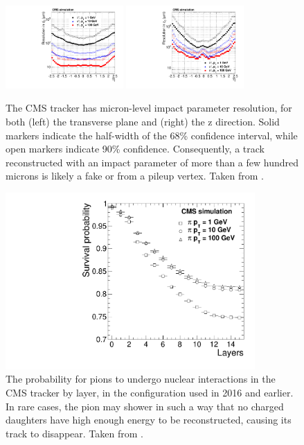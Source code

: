  \begin{figure}[h!]
    \centering
    \includegraphics[width=0.4\textwidth]{figures/pi/resolutionD0VsEta.pdf}
    \includegraphics[width=0.4\textwidth]{figures/pi/resolutionDzVsEta.pdf}
    \caption[Impact parameter resolution in the CMS tracker.]{
      The CMS tracker has micron-level impact parameter resolution, for both (left) the transverse plane and (right) the z direction.
      Solid markers indicate the half-width of the 68\% confidence interval, while open markers indicate 90\% confidence.
      Consequently, a track reconstructed with an impact parameter of more than a few hundred microns is likely a fake or from a pileup vertex.
      Taken from \cite{cmstracking}.}
    \label{fig:hitefficiency}
  \end{figure}  

  \begin{figure}[h!]
    \centering
    \includegraphics[width=0.85\textwidth]{figures/PionSurvivalProbability.pdf}
    \caption[Pion survival in the tracker.]{
      The probability for pions to undergo nuclear interactions in the CMS tracker by layer, in the configuration used in 2016 and earlier. 
      In rare cases, the pion may shower in such a way that no charged daughters have high enough energy to be reconstructed, causing its track to disappear.
      Taken from \cite{cmstracking}.}
    \label{fig:pionsurvival}
  \end{figure}  


